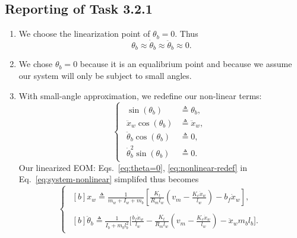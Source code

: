 \documentclass[11pt]{article} %
\begin{document}
\subsection*{Reporting of Task 3.2.1}
\begin{enumerate}
\item %
  We choose the linearization point of $\theta_b = 0$. Thus
  \begin{equation}\label{eq:theta=0}
    \theta_b \approx \dot{\theta}_b \approx \ddot{\theta}_b \approx 0.
  \end{equation}
\item %
  We chose $\theta_b = 0$ because it is an equalibrium point and because we assume our system will only be subject to small angles.
\item %
  With small-angle approximation, we redefine our non-linear terms:
  \begin{equation}\label{eq:nonlinear-redef}
    \begin{cases}
      \begin{aligned}
        \sin(\theta_b) &\triangleq \theta_b, \\
        \ddot{x}_w \cos(\theta_b) &\triangleq \ddot{x}_w, \\
        \ddot{\theta}_b \cos(\theta_b) &\triangleq 0, \\
        \dot{\theta}_b^2 \sin(\theta_b) &\triangleq 0.
      \end{aligned}
    \end{cases}
  \end{equation}
  Our linearized \ac{EOM}: Eqs.~\eqref{eq:theta=0}, \eqref{eq:nonlinear-redef}
  in Eq.~\eqref{eq:system-nonlinear} simplifed thus becomes
  \begin{equation}
    \begin{cases}
      \begin{aligned}[b]
        {x}_w \triangleq
        \frac{1}{m_w + I_w + m_b}\left[
          \frac{K_t}{R_m l_w}\left(
            v_m - \frac{K_e \dot{x}_w}{l_w}
          \right)
          - b_f \dot{x}_w
        \right],
      \end{aligned}\\[1em]
      \begin{aligned}[b]
        \ddot{\theta}_b \triangleq
        \frac{1}{I_b + m_b l_b^2}\bigg[
        \frac{b_f \dot{x}_w}{l_w}
        - \frac{K_t}{R_m l_w}\left(
          v_m
          - \frac{K_e \dot{x}_w}{l_w}
        \right)
        - \ddot{x}_w m_b l_b
        \bigg].
      \end{aligned}
    \end{cases}
  \end{equation}
\end{enumerate}
\end{document}
